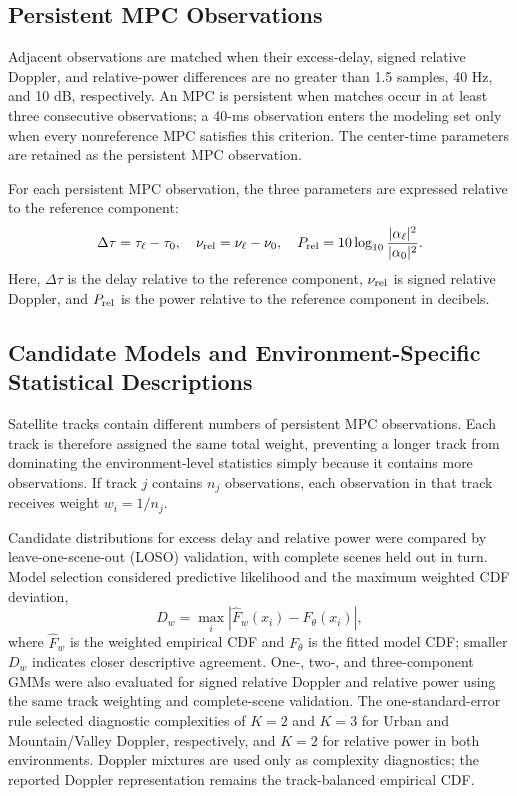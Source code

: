 \documentclass[conference]{IEEEtran}
\begin{document}
\subsection{Persistent MPC Observations}
Adjacent observations are matched when their excess-delay, signed relative Doppler, and relative-power differences are no greater than 1.5 samples, 40 Hz, and 10 dB, respectively. An MPC is persistent when matches occur in at least three consecutive observations; a 40-ms observation enters the modeling set only when every nonreference MPC satisfies this criterion. The center-time parameters are retained as the persistent MPC observation.

For each persistent MPC observation, the three parameters are expressed relative to the reference component:
\begin{equation}
\Delta\tau=\tau_{\ell}-\tau_{0},\quad
\nu_{\rm rel}=\nu_{\ell}-\nu_{0},\quad
P_{\rm rel}=10\log_{10}\frac{|\alpha_{\ell}|^2}{|\alpha_{0}|^2}.
\label{eq:parameters}
\end{equation}
Here, $\Delta\tau$ is the delay relative to the reference component, $\nu_{\rm rel}$ is signed relative Doppler, and $P_{\rm rel}$ is the power relative to the reference component in decibels.

\subsection{Candidate Models and Environment-Specific Statistical Descriptions}
Satellite tracks contain different numbers of persistent MPC observations. Each track is therefore assigned the same total weight, preventing a longer track from dominating the environment-level statistics simply because it contains more observations. If track $j$ contains $n_j$ observations, each observation in that track receives weight $w_i=1/n_j$.

Candidate distributions for excess delay and relative power were compared by leave-one-scene-out (LOSO) validation, with complete scenes held out in turn. Model selection considered predictive likelihood and the maximum weighted CDF deviation,
\begin{equation}
D_w=\max_i\left|\widehat F_w(x_i)-F_\theta(x_i)\right|,
\label{eq:cdf-distance}
\end{equation}
where $\widehat F_w$ is the weighted empirical CDF and $F_\theta$ is the fitted model CDF; smaller $D_w$ indicates closer descriptive agreement. One-, two-, and three-component GMMs were also evaluated for signed relative Doppler and relative power using the same track weighting and complete-scene validation. The one-standard-error rule selected diagnostic complexities of $K=2$ and $K=3$ for Urban and Mountain/Valley Doppler, respectively, and $K=2$ for relative power in both environments. Doppler mixtures are used only as complexity diagnostics; the reported Doppler representation remains the track-balanced empirical CDF.
\end{document}

